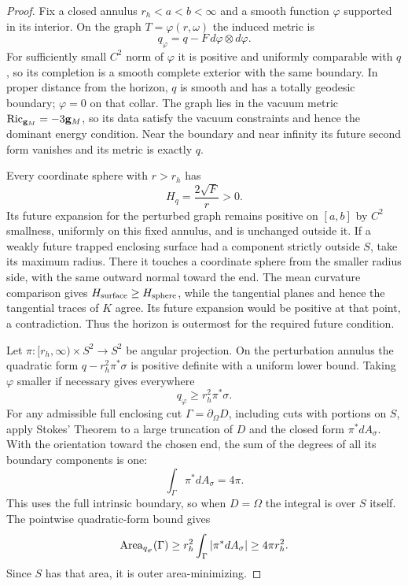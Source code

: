 \begin{proof}
Fix a closed annulus
$r_h<a<b<\infty$ and a smooth function $\varphi$ supported in
its interior.  On the graph $T=\varphi(r,\omega)$ the induced
metric is
\begin{equation}
 q_\varphi=q-F\,d\varphi\otimes d\varphi .
 \label{emb-example-metric}
\end{equation}
For sufficiently small $C^2$ norm of $\varphi$ it is positive
and uniformly comparable with $q$, so its completion is a smooth
complete exterior with the same boundary.  In proper distance from
the horizon, $q$ is smooth and has a totally geodesic boundary;
$\varphi=0$ on that collar.  The graph lies in the vacuum metric
$\operatorname{Ric}_{\mathbf g_M}=-3\mathbf g_M$, so its data satisfy the vacuum
constraints and hence the dominant energy condition.  Near the
boundary and near infinity its future second form vanishes and
its metric is exactly $q$.

Every coordinate sphere with $r>r_h$ has
\[
 H_q=\frac{2\sqrt F}{r}>0.
\]
Its future expansion for the perturbed graph remains positive on
$[a,b]$ by $C^2$ smallness, uniformly on this fixed annulus, and
is unchanged outside it.  If a weakly future trapped enclosing
surface had a component strictly outside $S$, take its maximum
radius.  There it touches a coordinate sphere from the smaller
radius side, with the same outward normal toward the end.  The
mean curvature comparison gives $H_{\rm surface}\geq
H_{\rm sphere}$, while the tangential planes and hence the
tangential traces of $K$ agree.  Its future expansion would be
positive at that point, a contradiction.  Thus the horizon is
outermost for the required future condition.

Let $\pi:[r_h,\infty)\times S^2\to S^2$ be angular projection.
On the perturbation annulus the quadratic form
$q-r_h^2\pi^*\sigma$ is positive definite with a uniform lower
bound.  Taking $\varphi$ smaller if necessary gives everywhere
\[
 q_\varphi\geq r_h^2\pi^*\sigma.
\]
For any admissible full enclosing cut $\Gamma=\partial_\Omega D$,
including cuts with portions on $S$, apply Stokes' Theorem to a
large truncation of $D$ and the closed form
$\pi^*dA_\sigma$.  With the orientation toward the chosen end,
the sum of the degrees of all its boundary components is one:
\[
 \int_\Gamma \pi^*dA_\sigma=4\pi .
\]
This uses the full intrinsic boundary, so when $D=\Omega$ the
integral is over $S$ itself.  The pointwise quadratic-form bound
gives
\[
 \operatorname{Area}_{q_\varphi}(\Gamma)
 \geq r_h^2\int_\Gamma|\pi^*dA_\sigma|
 \geq4\pi r_h^2.
\]
Since $S$ has that area, it is outer area-minimizing.


\end{proof}
